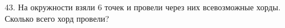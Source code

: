 43. На окружности взяли 6 точек и провели через них всевозможные хорды. Сколько всего хорд провели?\\
